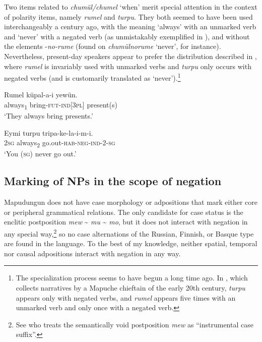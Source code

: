 \documentclass[output=paper,colorlinks,citecolor=brown,draft]{langscibook}
\begin{document}
Two items related to \textit{chumül/chumel} ‘when’ merit special attention in the context of polarity items, namely \textit{rumel} and \textit{turpu}. They both seemed to have been used interchangeably a century ago, with the meaning ‘always’ with an unmarked verb and ‘never’ with a negated verb (as unmistakably exemplified in \citealt{Augusta1903,Augusta1916}), and without the elements \nobreakdash-\textit{no-rume} (found on \textit{chumülnorume} ‘never’, for instance). Nevertheless, present-day speakers appear to prefer the distribution described in \citet{Smeets2008}, where \textit{rumel} is invariably used with unmarked verbs  and \textit{turpu} only occurs with negated verbs  (and is customarily translated as ‘never’).\footnote{The specialization process seems to have begun a long time ago. In \citet{Coña1995}, which collects narratives by a Mapuche chieftain of the early 20th century, \textit{turpu} appears only with negated verbs, and \textit{rumel} appears five times with an unmarked verb and only once with a negated verb.}

\ea\label{ex:mapu:26}
    
    \ea\label{ex:mapu:26a}
        \gll Rumel    küpal-a-i      yewün. \\ 
             always\textsubscript{1}  bring-\textsc{fut-ind[3pl]} present(s) \\
        \glt ‘They always bring presents.’ \citep[555]{Smeets2008}
    
    \ex\label{ex:mapu:26b}
        \gll Eymi  turpu    tripa-ke-la-i-m-i. \\
             \textsc{2sg} always\textsubscript{2}  go.out-\textsc{hab-neg-ind-2-sg} \\
        \glt  ‘You (\textsc{sg}) never go out.’ \citep[559]{Smeets2008}
    
    \z
\z 

\subsection{Marking of NPs in the scope of negation}

Mapudungun does not have case morphology or adpositions that mark either core or peripheral grammatical relations. The only candidate for case status is the enclitic postposition \textit{mew} {\textasciitilde} \textit{mu} {\textasciitilde} \textit{mo}, but it does not interact with negation in any special way,\footnote{See \citet[61--67]{Smeets2008} who treats the semantically void postposition \textit{mew} as “instrumental case suffix”.}
so no case alternations of the Russian, Finnish, or Basque type are found in the language. To the best of my knowledge, neither spatial, temporal nor causal adpositions interact with negation in any way.
\end{document}
